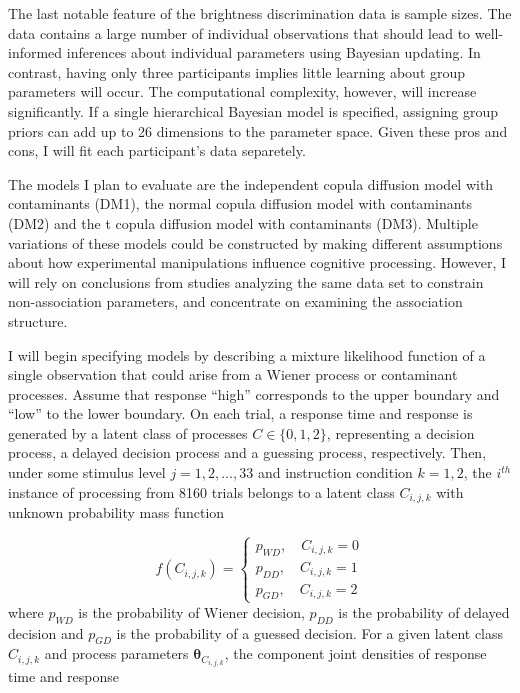 \documentclass[12pt]{article}
\begin{document}
	The last notable feature of the brightness discrimination data is sample sizes. The data contains a large number of individual observations that should lead to well-informed inferences about individual parameters using Bayesian updating. In contrast, having only three participants implies little learning about group parameters will occur. The computational complexity, however, will increase significantly. If a single hierarchical Bayesian model is specified, assigning group priors can add up to 26 dimensions to the parameter space. Given these pros and cons, I will fit each participant's data separetely. 	
    
	The models I plan to evaluate are the independent copula diffusion model with contaminants (DM1), the normal copula diffusion model with contaminants (DM2) and the t copula diffusion model with contaminants (DM3). Multiple variations of these models could be constructed by making different assumptions about how experimental manipulations influence cognitive processing. However, I will rely on conclusions from studies analyzing the same data set to constrain non-association parameters, and concentrate on examining the association structure.
    
	I will begin specifying models by describing a mixture likelihood function of a single observation that could arise from a Wiener process or contaminant processes. Assume that response “high” corresponds to the upper boundary and “low” to the lower boundary. On each trial, a response time and response is generated by a latent class of processes $C \in \{0, 1, 2\}$, representing a decision process, a delayed decision process and a guessing process, respectively. Then, under some stimulus level $j = 1, 2, \dots, 33$ and instruction condition $k = 1, 2$, the $i^{th}$ instance of processing from 8160 trials belongs to a latent class $C_{i,j,k}$ with unknown probability mass function
    
\begin{equation}
f(C_{i,j,k}) = 
\begin{cases}
p_{WD}, \quad C_{i,j,k} = 0 \\
p_{DD}, \quad C_{i,j,k} = 1 \\
p_{GD}, \quad C_{i,j,k} = 2
\end{cases}
\end{equation}
where ${p_{WD}}$ is the probability of Wiener decision, ${p_{DD}}$ is the probability of delayed decision and ${p_{GD}}$ is the probability of a guessed decision. For a given latent class $C_{i,j,k}$ and process parameters $\boldsymbol{\theta}_{C_{i,j,k}}$, the component joint densities of response time and response 
\end{document}
